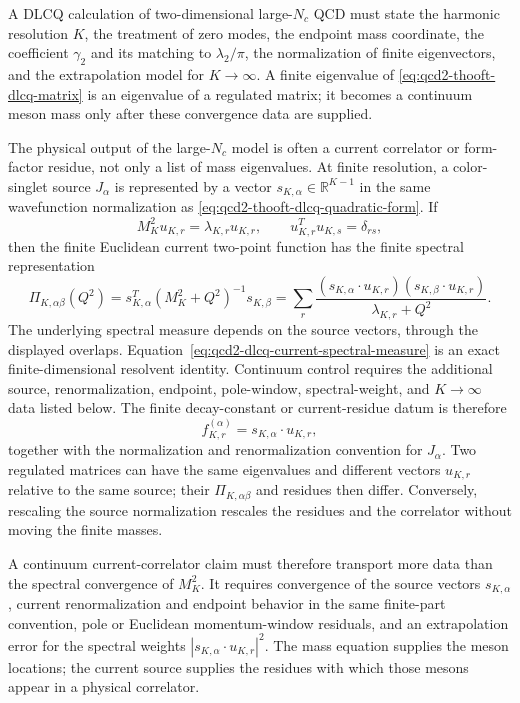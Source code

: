 \begin{remark}
A DLCQ calculation of two-dimensional large-\(N_c\) QCD must state the
harmonic resolution \(K\), the treatment of zero modes, the endpoint mass
coordinate, the coefficient \(\gamma_2\) and its matching to
\(\lambda_2/\pi\), the normalization of finite eigenvectors, and the
extrapolation model for \(K\to\infty\).  A finite eigenvalue of
\eqref{eq:qcd2-thooft-dlcq-matrix} is an eigenvalue of a regulated
matrix; it becomes a continuum meson mass only after these convergence data
are supplied.
\end{remark}

\begin{remark}
\label{rem:qcd2-dlcq-current-correlator-residue-map}
The physical output of the large-\(N_c\) model is often a current correlator
or form-factor residue, not only a list of mass eigenvalues.  At finite
resolution, a color-singlet source \(J_\alpha\) is represented by a vector
\(s_{K,\alpha}\in\mathbb R^{K-1}\) in the same wavefunction normalization as
\eqref{eq:qcd2-thooft-dlcq-quadratic-form}.  If
\[
  M_K^2 u_{K,r}=\lambda_{K,r}u_{K,r},
  \qquad
  u_{K,r}^Tu_{K,s}=\delta_{rs},
\]
then the finite Euclidean current two-point function has the finite spectral
representation
\begin{equation}
  \Pi_{K,\alpha\beta}(Q^2)
  =
  s_{K,\alpha}^{T}(M_K^2+Q^2)^{-1}s_{K,\beta}
  =
  \sum_r
  \frac{
    (s_{K,\alpha}\!\cdot u_{K,r})
    (s_{K,\beta}\!\cdot u_{K,r})
  }{\lambda_{K,r}+Q^2}.
  \label{eq:qcd2-dlcq-current-spectral-measure}
\end{equation}
The underlying spectral measure depends on the source vectors, through the
displayed overlaps.  Equation~\eqref{eq:qcd2-dlcq-current-spectral-measure}
is an exact finite-dimensional resolvent identity.  Continuum control requires
the additional source, renormalization, endpoint, pole-window, spectral-weight,
and \(K\to\infty\) data listed below.
The finite decay-constant or current-residue datum is therefore
\[
  f_{K,r}^{(\alpha)}=s_{K,\alpha}\!\cdot u_{K,r},
\]
together with the normalization and renormalization convention for
\(J_\alpha\).  Two regulated matrices can have the same eigenvalues and
different vectors \(u_{K,r}\) relative to the same source; their
\(\Pi_{K,\alpha\beta}\) and residues then differ.  Conversely, rescaling the
source normalization rescales the residues and the correlator without moving
the finite masses.

A continuum current-correlator claim must therefore transport more data than
the spectral convergence of \(M_K^2\).  It requires convergence of the source
vectors \(s_{K,\alpha}\), current renormalization and endpoint behavior in the
same finite-part convention, pole or Euclidean momentum-window residuals, and
an extrapolation error for the spectral weights
\(|s_{K,\alpha}\!\cdot u_{K,r}|^2\).  The mass equation supplies the meson
locations; the current source supplies the residues with which those mesons
appear in a physical correlator.
\end{remark}

